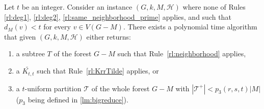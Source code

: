 \documentclass{amsart}
\newcommand{\mT}{\mathcal{T}}
\newcommand{\mH}{\mathcal{H}}
\newcommand{\KttTilde}{\widetilde{K_{t,t}}}
\newcommand{\ruleref}[1]{\hyperref[#1]{\ref*{#1}}}
\begin{document}
\begin{lemma}\label{lem:construct-red-trees}
Let $t$ be an integer. Consider an instance $(G, k, M, \mH)$ where none of Rules \ruleref{rl:deg1}, \ruleref{rl:deg2}, \ruleref{rl:same_neighborhood_prime} applies, and such that $d_M(v)< t$ for every $v\in V(G-M)$.
There exists a polynomial time algorithm that given $(G, k, M,\mH)$ either returns:
\begin{enumerate}
    \item \label{part:case1} a subtree $T$ of the forest $G-M$ such that Rule~\ruleref{rl:neighborhood} applies,
\item \label{part:case2} a $\KttTilde$ such that Rule~\ruleref{rl:KrrTilde} applies, or
    \item \label{part:case3} a $t$-uniform partition $\mT$ of the whole forest $G-M$ with $|\mT^+|<p_3(r,s,t)|M|$ ($p_3$ being defined in \autoref{lm:bigreduce}).
\end{enumerate}

\end{lemma}
\end{document}
